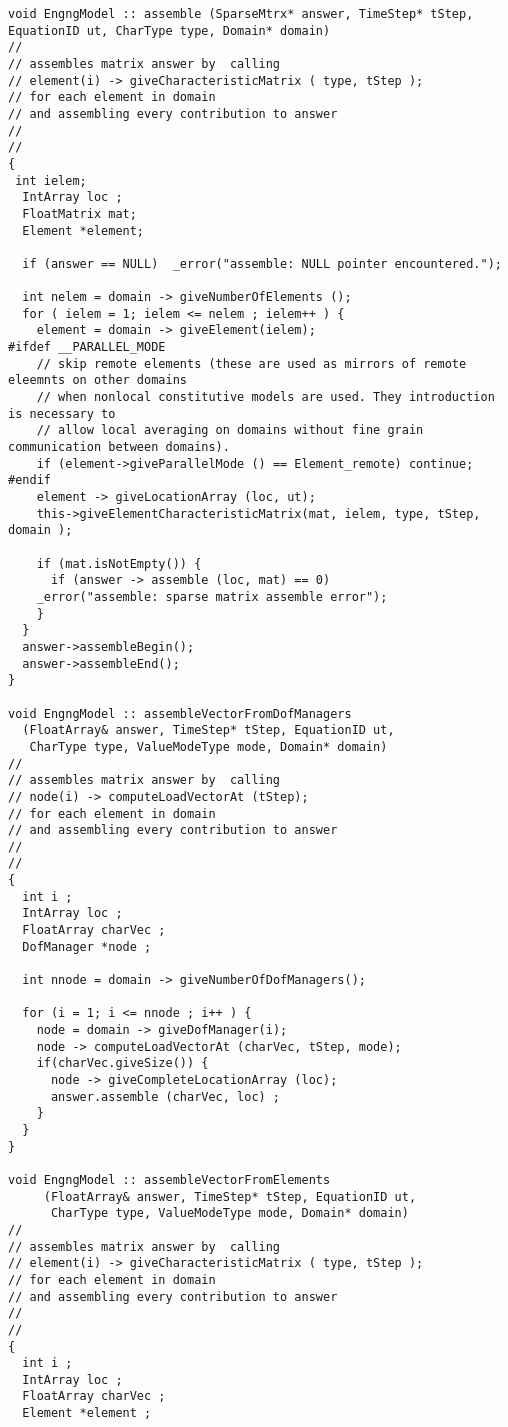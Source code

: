 \documentclass[12pt,draft]{article}
\begin{document}
{\small\begin{verbatim}
void EngngModel :: assemble (SparseMtrx* answer, TimeStep* tStep, EquationID ut, CharType type, Domain* domain) 
//
// assembles matrix answer by  calling  
// element(i) -> giveCharacteristicMatrix ( type, tStep );
// for each element in domain 
// and assembling every contribution to answer
//
//
{
 int ielem;
  IntArray loc ;
  FloatMatrix mat;
  Element *element;

  if (answer == NULL)  _error("assemble: NULL pointer encountered.");

  int nelem = domain -> giveNumberOfElements ();
  for ( ielem = 1; ielem <= nelem ; ielem++ ) {
    element = domain -> giveElement(ielem);
#ifdef __PARALLEL_MODE
    // skip remote elements (these are used as mirrors of remote eleemnts on other domains
    // when nonlocal constitutive models are used. They introduction is necessary to
    // allow local averaging on domains without fine grain communication between domains).
    if (element->giveParallelMode () == Element_remote) continue;
#endif
    element -> giveLocationArray (loc, ut);
    this->giveElementCharacteristicMatrix(mat, ielem, type, tStep, domain );
 
    if (mat.isNotEmpty()) {
      if (answer -> assemble (loc, mat) == 0) 
	_error("assemble: sparse matrix assemble error");
    }  
  }
  answer->assembleBegin();
  answer->assembleEnd();
}

void EngngModel :: assembleVectorFromDofManagers 
  (FloatArray& answer, TimeStep* tStep, EquationID ut, 
   CharType type, ValueModeType mode, Domain* domain) 
//
// assembles matrix answer by  calling  
// node(i) -> computeLoadVectorAt (tStep); 
// for each element in domain 
// and assembling every contribution to answer
//
//
{
  int i ;
  IntArray loc ;
  FloatArray charVec ;
  DofManager *node ;
  
  int nnode = domain -> giveNumberOfDofManagers();
  
  for (i = 1; i <= nnode ; i++ ) {
    node = domain -> giveDofManager(i);
    node -> computeLoadVectorAt (charVec, tStep, mode);
    if(charVec.giveSize()) {
      node -> giveCompleteLocationArray (loc);
      answer.assemble (charVec, loc) ;
    }
  }
}

void EngngModel :: assembleVectorFromElements 
     (FloatArray& answer, TimeStep* tStep, EquationID ut,
      CharType type, ValueModeType mode, Domain* domain) 
//
// assembles matrix answer by  calling  
// element(i) -> giveCharacteristicMatrix ( type, tStep );
// for each element in domain 
// and assembling every contribution to answer
//
//
{
  int i ;
  IntArray loc ;
  FloatArray charVec ;
  Element *element ;
 

\end{verbatim}}
\end{document}
